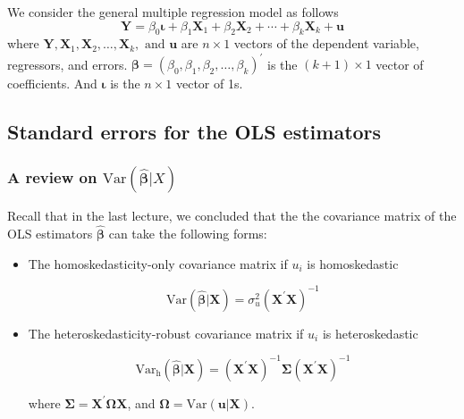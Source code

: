 \documentclass[a4paper,11pt]{article}
\newcommand{\var}{\mathrm{Var}}
\begin{document}
We consider the general multiple regression model as follows
\begin{equation}
\label{eq:jnt-hyp-mod}
\mathbf{Y} = \beta_0 \boldsymbol{\iota} + \beta_1 \mathbf{X}_1 + \beta_2 \mathbf{X}_2 + \cdots + \beta_k \mathbf{X}_k + \mathbf{u}
\end{equation}
where \(\mathbf{Y}, \mathbf{X}_1, \mathbf{X}_2, \ldots, \mathbf{X}_k, \text{ and } \mathbf{u}\) are \(n
\times 1\) vectors of the dependent variable, regressors, and
errors. \(\boldsymbol{\beta} = (\beta_0, \beta_1, \beta_2, \ldots,
\beta_k)^{\prime}\) is the \((k+1) \times 1\) vector of coefficients. And
\(\boldsymbol{\iota}\) is the \(n \times 1\) vector of 1s. 

\subsection{Standard errors for the OLS estimators}
\label{sec:org7775efb}

\subsubsection*{A review on \(\var(\hat{\boldsymbol{\beta}}|X)\)}
\label{sec:org6edbbf3}

Recall that in the last lecture, we concluded that the the covariance
matrix of the OLS estimators \(\hat{\boldsymbol{\beta}}\) can take the
following forms:

\begin{itemize}
\item The homoskedasticity-only covariance matrix if \(u_i\) is
homoskedastic

\begin{equation}
\label{eq:varbhat-hm-1}
\var(\hat{\boldsymbol{\beta}} | \mathbf{X}) = \sigma^2_u (\mathbf{X}^{\prime} \mathbf{X})^{-1}
\end{equation}

\item The heteroskedasticity-robust covariance matrix if \(u_i\) is
heteroskedastic

\begin{equation}
\label{eq:varbhat-ht-1}
\var_{\mathrm{h}}(\hat{\boldsymbol{\beta}} | \mathbf{X}) = \left(\mathbf{X}^{\prime} \mathbf{X}\right)^{-1} \boldsymbol{\Sigma} (\mathbf{X}^{\prime} \mathbf{X})^{-1}
\end{equation}

where \(\boldsymbol{\Sigma} = \mathbf{X}^{\prime} \boldsymbol{\Omega}
  \mathbf{X}\), and \(\mathbf{\Omega} = \var(\mathbf{u} |
  \mathbf{X})\).
\end{itemize}
\end{document}
